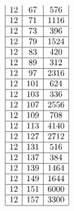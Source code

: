 \documentclass[a4paper, 10pt]{article}
\begin{document}
\begin{center}
\begin{minipage}[t]{.23\textwidth}
\begin{displaymath}
\begin{array}{|c|c|c|}
12 & 67 & 576 \\ \hline
12 & 71 & 1116 \\ \hline
12 & 73 & 396 \\ \hline
12 & 79 & 1524 \\ \hline
12 & 83 & 420 \\ \hline
12 & 89 & 312 \\ \hline
12 & 97 & 2316 \\ \hline
12 & 101 & 624 \\ \hline
12 & 103 & 336 \\ \hline
12 & 107 & 2556 \\ \hline
12 & 109 & 708 \\ \hline
12 & 113 & 4140 \\ \hline
12 & 127 & 2712 \\ \hline
12 & 131 & 516 \\ \hline
12 & 137 & 384 \\ \hline
12 & 139 & 1464 \\ \hline
12 & 149 & 1644 \\ \hline
12 & 151 & 6000 \\ \hline
12 & 157 & 3300 \\ \hline
\end{array}
\end{displaymath}
\end{minipage}
\end{center}
\end{document}
